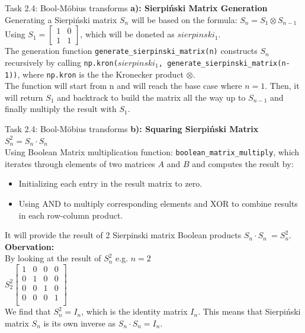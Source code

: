 \documentclass[aspectratio=169]{beamer}
\begin{document}
\begin{frame}{Task 2.4: Bool-Möbius transforms}
\textbf{a): Sierpiński Matrix Generation}\\
Generating a Sierpiński matrix \( S_n \) will be based on the formula: \( S_n = S_1 \otimes S_{n-1} \)\\
Using \( S_1 = \begin{bmatrix} 1 & 0 \\ 1 & 1 \end{bmatrix} \), which will be doneted as $sierpinski_1$.\\
The generation function \texttt{generate\_sierpinski\_matrix(n)} constructs \( S_n \) recursively by calling \texttt{np.kron($sierpinski_1$, generate\_sierpinski\_matrix(n-1))}, where \texttt{np.kron} is the the Kronecker product \( \otimes \).\\
The function will start from n and will reach the base case where $n = 1$. Then, it will return \( S_1\) and backtrack to build the matrix all the way up to \( S_{n-1}\) and finally multiply the result with \( S_1\).

\end{frame}

\begin{frame}{Task 2.4: Bool-Möbius transforms}
\textbf{b): Squaring Sierpiński Matrix \( S_n^2 = S_n \cdot S_n \)}\\
Using Boolean Matrix multiplication function: \texttt{boolean\_matrix\_multiply}, which iterates through elements of two matrices \( A \) and \( B \) and computes the result by:
\begin{itemize}
    \item Initializing each entry in the result matrix to zero.
    \item Using AND to multiply corresponding elements and XOR to combine results in each row-column product.
\end{itemize}
It will provide the result of 2 Sierpinski matrix Boolean products \(S_n \cdot S_n\ = S_n^2 \).\\
\textbf{Obervation: }\\
By looking at the result of \( S_n^2 \) e.g. $n=2$\\ \( S_2^2
\begin{bmatrix}
1 & 0 & 0 & 0 \\
0 & 1 & 0 & 0 \\
0 & 0 & 1 & 0 \\
0 & 0 & 0 & 1 \\
\end{bmatrix}
\)\\
We find that \( S_n^2 = I_n \), which is the identity matrix $I_n$. This means that Sierpiński matrix
$S_n$ is its own inverse as \(S_n \cdot S_n = I_n \).
\end{frame}
\end{document}

